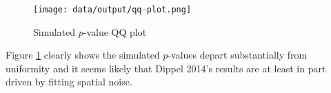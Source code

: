 \documentclass[12pt]{article}
\begin{document}
\begin{figure}[htbp]
    \centering
    \texttt{[image: data/output/qq-plot.png]}
    \caption{Simulated $p$-value QQ plot}
    \label{qq}
\end{figure}

Figure \ref{qq} clearly shows the simulated $p$-values depart substantially from uniformity and it seems likely that Dippel 2014's results are at least 
in part driven by fitting spatial noise.



\FloatBarrier


\end{document}
